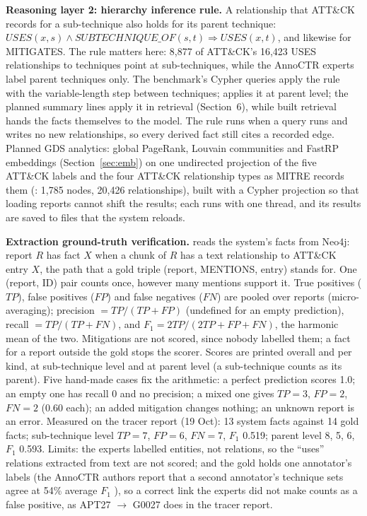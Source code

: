 \documentclass[10pt]{article}
\begin{document}
\textbf{Reasoning layer 2: hierarchy inference rule.} A relationship that ATT\&CK records for a sub-technique also holds for its parent technique:
$\mathit{USES}(x, s) \wedge \mathit{SUBTECHNIQUE\_OF}(s, t) \Rightarrow \mathit{USES}(x, t)$, and likewise for MITIGATES. The rule matters here: 8,877 of ATT\&CK's 16,423 USES relationships to techniques point at sub-techniques, while the AnnoCTR experts label parent techniques only. The benchmark's Cypher queries apply the rule with the variable-length step \code{-[:SUBTECHNIQUE\_OF*0..1]->} between techniques;  applies it at parent level; the planned summary lines apply it in retrieval (Section~6), while built retrieval hands the  facts themselves to the model. The rule runs when a query runs and writes no new relationships, so every derived fact still cites a recorded edge. Planned GDS analytics: global PageRank, Louvain communities and FastRP embeddings (Section~\ref{sec:emb}) on one undirected projection of the five ATT\&CK labels and the four ATT\&CK relationship types as MITRE records them (: 1,785 nodes, 20,426 relationships), built with a Cypher projection so that loading reports cannot shift the results; each runs with one thread, and its results are saved to files that the system reloads.

\textbf{Extraction ground-truth verification.}  reads the system's facts from Neo4j: report $R$ has fact $X$ when a chunk of $R$ has a text  relationship to ATT\&CK entry $X$, the path that a gold triple (report, MENTIONS, entry) stands for. One (report, ID) pair counts once, however many mentions support it. True positives ($\mathit{TP}$), false positives ($\mathit{FP}$) and false negatives ($\mathit{FN}$) are pooled over reports (micro-averaging); precision $=\mathit{TP}/(\mathit{TP}+\mathit{FP})$ (undefined for an empty prediction), recall $=\mathit{TP}/(\mathit{TP}+\mathit{FN})$, and $F_1 = 2\mathit{TP}/(2\mathit{TP}+\mathit{FP}+\mathit{FN})$, the harmonic mean of the two. Mitigations are not scored, since nobody labelled them; a fact for a report outside the gold stops the scorer. Scores are printed overall and per kind, at sub-technique level and at parent level (a sub-technique counts as its parent). Five hand-made cases fix the arithmetic: a perfect prediction scores 1.0; an empty one has recall 0 and no precision; a mixed one gives $\mathit{TP}{=}3$, $\mathit{FP}{=}2$, $\mathit{FN}{=}2$ (0.60 each); an added mitigation changes nothing; an unknown report is an error. Measured on the tracer report (19 Oct): 13 system facts against 14 gold facts; sub-technique level $\mathit{TP}{=}7$, $\mathit{FP}{=}6$, $\mathit{FN}{=}7$, $F_1$ 0.519; parent level 8, 5, 6, $F_1$ 0.593. Limits: the experts labelled entities, not relations, so the ``uses'' relations extracted from text are not scored; and the gold holds one annotator's labels (the AnnoCTR authors report that a second annotator's technique sets agree at 54\% average $F_1$ \cite{1}), so a correct link the experts did not make counts as a false positive, as APT27 $\rightarrow$ G0027 does in the tracer report.
\end{document}
